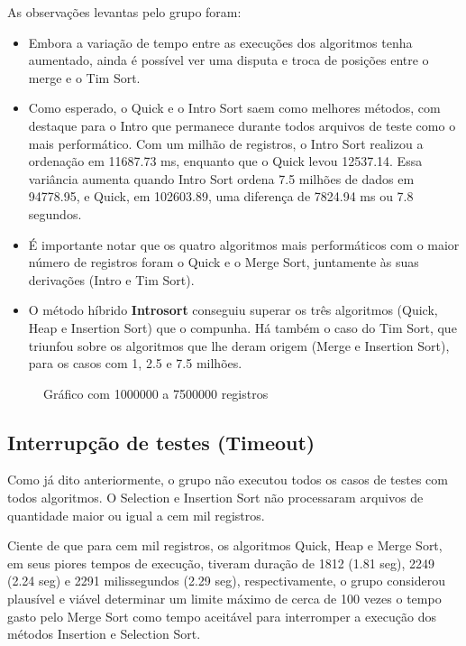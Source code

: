 \documentclass[a4paper,12pt]{scrartcl}
\begin{document}
As observações levantas pelo grupo foram:
\begin{itemize}
    \item
    Embora a variação de tempo entre as execuções dos algoritmos tenha aumentado, ainda é possível ver uma disputa e troca de posições entre o merge e o Tim Sort.

    \item
    Como esperado, o Quick e o Intro Sort saem como melhores métodos, com destaque para o Intro que permanece durante todos arquivos de teste como o mais performático. Com um milhão de registros, o Intro Sort realizou a ordenação em 11687.73 ms, enquanto que o Quick levou 12537.14. Essa variância aumenta quando Intro Sort ordena 7.5 milhões de dados em 94778.95, e Quick, em 102603.89, uma diferença de 7824.94 ms ou 7.8 segundos.
    
    \item É importante notar que os quatro algoritmos mais performáticos com o maior número de registros foram o Quick e o Merge Sort, juntamente às suas derivações (Intro e Tim Sort).
    
    \item
    O método híbrido \textbf{Introsort} conseguiu superar os três algoritmos (Quick, Heap e Insertion Sort) que o compunha. Há também o caso do Tim Sort, que triunfou sobre os algoritmos que lhe deram origem (Merge e Insertion Sort), para os casos com 1, 2.5 e 7.5 milhões.
    
\end{itemize}

\begin{figure}[H]
    \centering
    
    \caption{Gráfico com 1000000 a 7500000 registros}
    \label{mapaSelect}
\end{figure}


\subsection{Interrupção de testes (Timeout)}

Como já dito anteriormente, o grupo não executou todos os casos de testes com todos algoritmos. O Selection e Insertion Sort não processaram arquivos de quantidade maior ou igual a cem mil registros.

Ciente de que para cem mil registros, os algoritmos Quick, Heap e Merge Sort, em seus piores tempos de execução, tiveram duração de 1812 (1.81 seg), 2249 (2.24 seg) e 2291 milissegundos (2.29 seg), respectivamente, o grupo considerou plausível e viável determinar um limite máximo de cerca de 100 vezes o tempo gasto pelo Merge Sort como tempo aceitável para interromper a execução dos métodos Insertion e Selection Sort.
\end{document}
